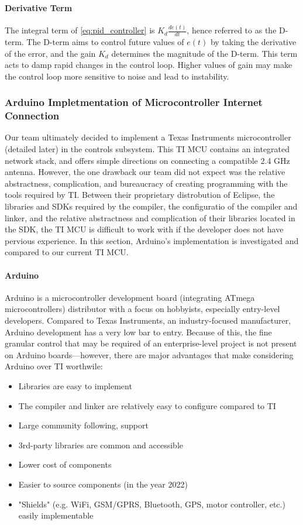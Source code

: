 \paragraph{Derivative Term} The integral term of \autoref{eq:pid_controller} is $K_d\frac{de(t)}{dt}$, hence referred to as the D-term. The D-term aims to control future values of $e(t)$ by taking the derivative of the error, and the gain $K_d$ determines the magnitude of the D-term. This term acts to damp rapid changes in the control loop. Higher values of gain may make the control loop more sensitive to noise and lead to instability.

\subsubsection{Arduino Impletmentation of Microcontroller Internet Connection} Our team ultimately decided to implement a Texas Instruments microcontroller (detailed later) in the controls subsystem. This TI MCU contains an integrated network stack, and offers simple directions on connecting a compatible 2.4 GHz antenna. However, the one drawback our team did not expect was the relative abstractness, complication, and bureaucracy of creating programming with the tools required by TI. Between their proprietary distrobution of Eclipse, the libraries and SDKs required by the compiler, the configuratio of the compiler and linker, and the relative abstractness and complication of their libraries located in the SDK, the TI MCU is difficult to work with if the developer does not have pervious experience. In this section, Arduino's implementation is investigated and compared to our current TI MCU.

\paragraph{Arduino} Arduino is a microcontroller development board (integrating ATmega microcontrollers) distributor with a focus on hobbyists, especially entry-level developers. Compared to Texas Instruments, an industry-focused manufacturer, Arduino development has a very low bar to entry. Because of this, the fine granular control that may be required of an enterprise-level project is not present on Arduino boards---however, there are major advantages that make considering Arduino over TI worthwile:
\begin{itemize}
    \item Libraries are easy to implement
    \item The compiler and linker are relatively easy to configure compared to TI
    \item Large community following, support
    \item 3rd-party libraries are common and accessible
    \item Lower cost of components
    \item Easier to source components (in the year 2022)
    \item "Shields" (e.g. WiFi, GSM/GPRS, Bluetooth, GPS, motor controller, etc.) easily implementable
\end{itemize}
